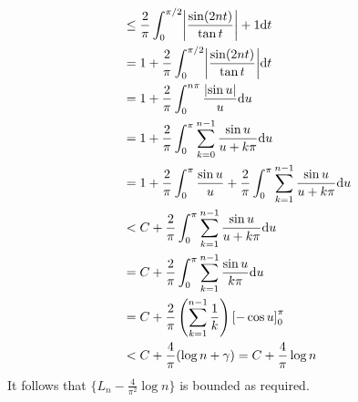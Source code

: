 \documentclass[a4paper, 12pt]{article}
\begin{document}
\begin{solution}
\begin{align*}
            &\leq \frac{2}{\pi} \int_{0}^{\pi/2} \abs*{\frac{\sin(2nt)}{\tan t}} + 1 \dt \\
            & = 1 + \frac{2}{\pi} \int_{0}^{\pi/2} \abs*{\frac{\sin(2nt)}{\tan t}} \dt \\
            &= 1 + \frac{2}{\pi} \int_{0}^{n\pi}\frac{\abs*{\sin u}}{u} \du \\
            &= 1 + \frac{2}{\pi} \int_{0}^{\pi} \sum_{k=0}^{n-1} \frac{\sin u}{u + k\pi} \du \\
            &= 1 + \frac{2}{\pi} \int_{0}^{\pi} \frac{\sin u}{u} + \frac{2}{\pi} \int_{0}^{\pi} \sum_{k=1}^{n-1} \frac{\sin u}{u + k\pi} \du \\
            &< C + \frac{2}{\pi}  \int_{0}^{\pi} \sum_{k=1}^{n-1} \frac{\sin u}{u + k\pi} \du \\
            &= C + \frac{2}{\pi} \int_{0}^{\pi} \sum_{k=1}^{n-1} \frac{\sin u}{k\pi} \du \\
            &= C + \frac{2}{\pi} \left(\sum_{k=1}^{n-1} \frac{1}{k}\right) \eval{-\cos u}{\pi}{0}  \\
            &< C + \frac{4}{\pi} (\log n + \gamma) = C + \frac{4}{\pi} \log n
    \end{align*}
    It follows that $\{L_n - \frac{4}{\pi^2} \log n\}$ is bounded as required.
\end{solution}

\end{document}
